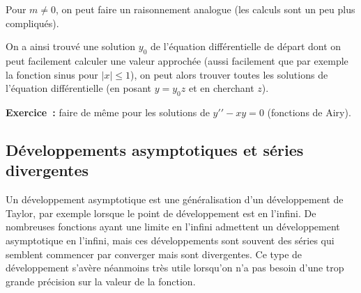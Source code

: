 \documentclass[a4paper,11pt]{article}
\begin{document}
Pour $m \neq 0$, on peut faire un raisonnement analogue (les
calculs sont un peu plus compliqu\'es).

On a ainsi trouv\'e une solution $y_0$ de l'\'equation
diff\'erentielle de d\'epart dont on peut facilement calculer
une valeur approch\'ee (aussi facilement que par exemple la fonction sinus
pour $|x| \leq 1$), 
on peut alors trouver toutes les solutions de l'\'equation
diff\'erentielle (en posant $y=y_0 z$ et en cherchant $z$).

{\bf Exercice~:} faire de m\^eme pour les solutions de
$y'{'}-xy=0$ (fonctions de Airy).

\subsection{Développements asymptotiques et séries
  divergentes}
Un développement asymptotique est une généralisation d'un développement de Taylor, par exemple
lorsque le point de développement est en l'infini. De nombreuses fonctions ayant
une limite en l'infini admettent un développement asymptotique en l'infini, mais ces
développements sont souvent des séries qui semblent commencer par converger
mais sont divergentes. Ce type de développement s'avère néanmoins très utile lorsqu'on
n'a pas besoin d'une trop grande précision sur la valeur de la fonction.
\end{document}
